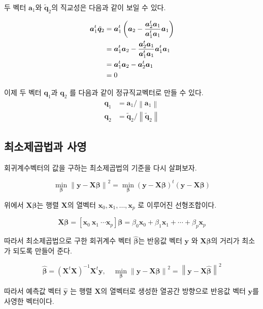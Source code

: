\documentclass[
  10pt,
]{book}
\newcommand{\norm}[1]{\left\lVert#1\right\rVert}
\theoremstyle{definition}
\theoremstyle{definition}
\theoremstyle{definition}
\theoremstyle{definition}
\theoremstyle{remark}
\begin{document}
두 벡터 \(\bm a_1\)와 \(\tilde {\bm q}_2\)의 직교성은 다음과 같이 보일 수 있다.

\begin{align}
\bm a_1^t  \tilde {\bm q}_2 & =
 \bm a_1^t  \left ( \bm a_2 -  \frac{ \bm a_2^t \bm a_1} {\bm a_1^t \bm a_1} \bm a_1 \right ) \notag \\
 & = \bm a_1^t \bm a_2 - \frac{ \bm a_2^t \bm a_1} {\bm a_1^t \bm a_1}  \bm a_1^t \bm a_1 \notag \\
 & = \bm a_1^t \bm a_2 - \bm a_2^t \bm a_1 \notag \\
 & = 0 
 \label{eq:proofortho}
\end{align}

이제 두 벡터 \(\bm q_1\)과 \(\bm q_2\) 를 다음과 같이 정규직교벡터로 만들 수 있다.
\begin{align*}
\bm q_1 & =  \bm a_1 / \norm{\bm a_1 } \\
\bm q_2 & =  \tilde {\bm q}_2 / \norm{\tilde {\bm q}_2}
\end{align*}

\hypertarget{uxcd5cuxc18cuxc81cuxacf1uxbc95uxacfc-uxc0acuxc601}{%
\subsection{최소제곱법과 사영}\label{uxcd5cuxc18cuxc81cuxacf1uxbc95uxacfc-uxc0acuxc601}}

회귀계수벡터의 값을 구하는 최소제곱법의 기준을 다시 살펴보자.

\[   \min_{\bm \beta } \norm{\bm y -  \bm X \bm \beta }^2= \min_{\bm \beta } ( \bm y -  \bm X \bm \beta )^t( \bm y -  \bm X \bm \beta )  \]

위에서 \(\bm X \bm \beta\)는 행렬 \(\bm X\)의 열벡터 \(\bm x_0, \bm x_1, \dots, \bm x_p\) 로 이루어진 선형조합이다.

\[ \bm X \bm \beta = [\bm x_0~\bm x_1~ \cdots \bm x_p]\bm \beta
 = \beta_0 \bm x_0  + \beta_1 \bm x_1 + \cdots + \beta_p \bm x_p \]

따라서 최소제곱법으로 구한 회귀계수 벡터 \(\hat {\bm \beta}\)는 반응값 벡터 \(\bm y\) 와 \(\bm X {\bm \beta}\)의 거리가 최소가 되도록 만들어 준다.

\[ \hat {\bm \beta} = (\bm X^t \bm X)^{-1} \bm X^t \bm y, \quad 
 \min_{\bm \beta } \norm{\bm y -  \bm X \bm \beta }^2 = \norm{\bm y -  \bm X \hat {\bm \beta} }^2
 \]

따라서 예측값 벡터 \(\hat {\bm y}\) 는 행렬 \(\bm X\)의 열벡터로 생성한 열공간 방향으로 반응값 벡터 \(\bm y\)를 사영한 벡터이다.
\end{document}
